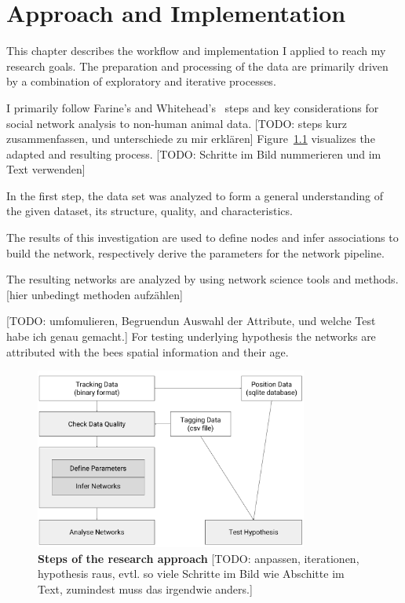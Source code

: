 \chapter{Approach and Implementation}
\label{ch:approach}

This chapter describes the workflow and implementation I applied to reach my research goals.
The preparation and processing of the data are primarily driven by a combination of exploratory and iterative processes.

I primarily follow  Farine's and Whitehead's~\cite{farine2015constructing} steps and key considerations for social network analysis to non-human animal data.
[TODO: steps kurz zusammenfassen, und unterschiede zu mir erklären]
Figure~\ref{fig:process} visualizes the adapted and resulting process.
[TODO: Schritte im Bild nummerieren und im Text verwenden]

In the first step, the data set was analyzed to form a general understanding of the given dataset, its structure, quality, and characteristics.

The results of this investigation are used to define nodes and infer associations to build the network, respectively derive the parameters for the network pipeline.

The resulting networks are analyzed by using network science tools and methods.
[hier unbedingt methoden aufzählen]

[TODO: umfomulieren, Begruendun Auswahl der Attribute, und welche Test habe ich genau gemacht.]
For testing underlying hypothesis the networks are attributed with the bees spatial information and their age.

\begin{figure}[htb]
	\centering
	\includegraphics[width=0.8\textwidth]{Figures/process}
	\caption[Steps of the research approach]{\textbf{Steps of the research approach} [TODO: anpassen, iterationen, hypothesis raus, evtl. so viele Schritte im Bild wie Abschitte im Text, zumindest muss das irgendwie anders.]}
	\label{fig:process}
\end{figure}




